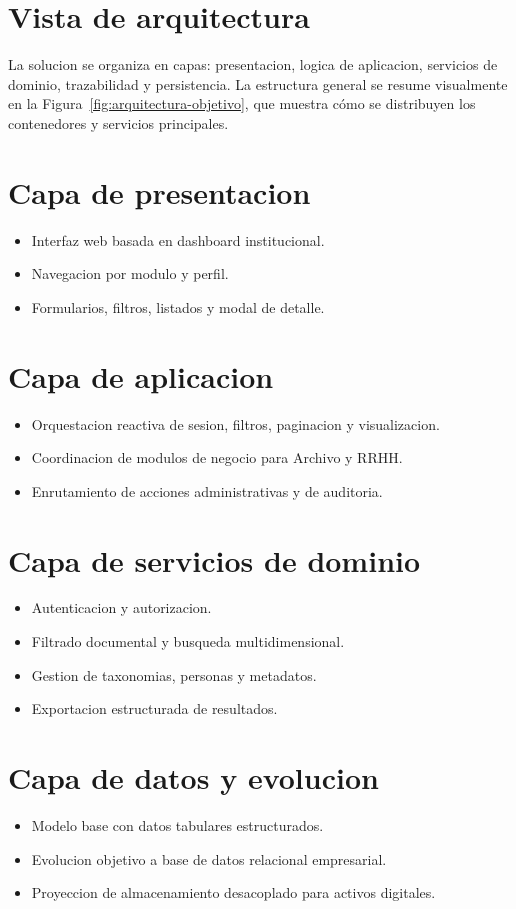 \section{Vista de arquitectura}
La solucion se organiza en capas: presentacion, logica de aplicacion, servicios de dominio, trazabilidad y persistencia.
La estructura general se resume visualmente en la Figura~\ref{fig:arquitectura-objetivo}, que muestra cómo se distribuyen los contenedores y servicios principales.

\section{Capa de presentacion}
\begin{itemize}
  \item Interfaz web basada en dashboard institucional.
  \item Navegacion por modulo y perfil.
  \item Formularios, filtros, listados y modal de detalle.
\end{itemize}

\section{Capa de aplicacion}
\begin{itemize}
  \item Orquestacion reactiva de sesion, filtros, paginacion y visualizacion.
  \item Coordinacion de modulos de negocio para Archivo y RRHH.
  \item Enrutamiento de acciones administrativas y de auditoria.
\end{itemize}

\section{Capa de servicios de dominio}
\begin{itemize}
  \item Autenticacion y autorizacion.
  \item Filtrado documental y busqueda multidimensional.
  \item Gestion de taxonomias, personas y metadatos.
  \item Exportacion estructurada de resultados.
\end{itemize}

\section{Capa de datos y evolucion}
\begin{itemize}
  \item Modelo base con datos tabulares estructurados.
  \item Evolucion objetivo a base de datos relacional empresarial.
  \item Proyeccion de almacenamiento desacoplado para activos digitales.
\end{itemize}

